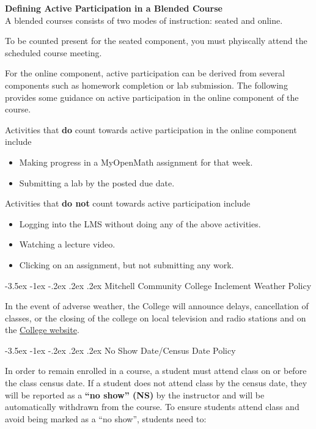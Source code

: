 \documentclass[11pt]{article}
\makeatletter
\renewcommand\section{\@startsection{section}{1}{0pt}%
  {-3.5ex \@plus -1ex \@minus -.2ex}%
  {.2ex \@plus.2ex}%
  {\normalfont\Large\bfseries}} %
\renewenvironment{framed}[1][]{%
  \def\FrameCommand{%
    \hspace{1pt}%
    {\color{mybordercolor}\vrule width 2pt} %
    \hspace{1pt}%
    \fboxsep=\FrameSep%
    \colorbox{mybgcolor}%
  }%
  \MakeFramed {\advance\hsize-\width \FrameRestore}%
}{%
  \endMakeFramed
}
\makeatother
\begin{document}
\begin{framed}
\textbf{Defining Active Participation in a Blended Course}\\
A blended courses consists of two modes of instruction: seated and online.

To be counted present for the seated component, you must phyiscally attend the scheduled course meeting.

For the online component, active participation can be derived from several components such as homework completion or lab submission. The following provides some guidance on active participation in the online component of the course.

Activities that \textbf{do} count towards active participation in the online component include

\begin{itemize}
\item Making progress in a MyOpenMath assignment for that week.
\item Submitting a lab by the posted due date.
\end{itemize}

Activities that \textbf{do not} count towards active participation include

\begin{itemize}
\item Logging into the LMS without doing any of the above activities.
\item Watching a lecture video.
\item Clicking on an assignment, but not submitting any work.
\end{itemize}
\end{framed}

\section{Mitchell Community College Inclement Weather Policy}

In the event of adverse weather, the College will announce delays, cancellation of classes, or the closing of the college on local television and radio stations and on the \href{https://www.mitchellcc.edu}{College website}.

\section{No Show Date/Census Date Policy}

In order to remain enrolled in a course, a student must attend class on or before the class census date. If a student does not attend class by the census date, they will be reported as a \textbf{``no show'' (NS)} by the instructor and will be automatically withdrawn from the course.  To ensure students attend class and avoid being marked as a ``no show'', students need to:
\end{document}
